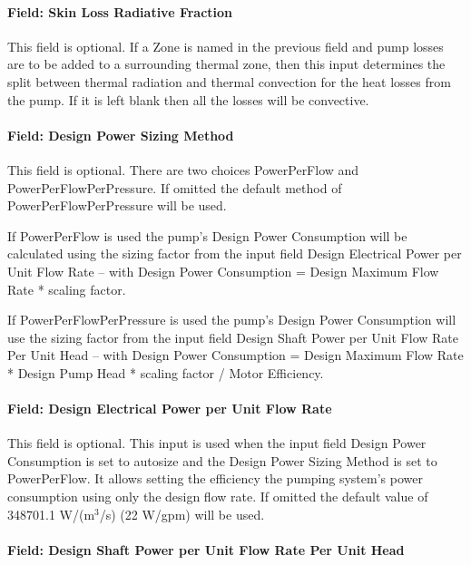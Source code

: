 \paragraph{Field: Skin Loss Radiative Fraction}\label{field-skin-loss-radiative-fraction-1-000}

This field is optional. If a Zone is named in the previous field and pump losses are to be added to a surrounding thermal zone, then this input determines the split between thermal radiation and thermal convection for the heat losses from the pump. If it is left blank then all the losses will be convective.

\paragraph{Field: Design Power Sizing Method}\label{field-design-power-sizing-method-1}

This field is optional. There are two choices PowerPerFlow and PowerPerFlowPerPressure. If omitted the default method of PowerPerFlowPerPressure will be used.

If PowerPerFlow is used the pump's Design Power Consumption will be calculated using the sizing factor from the input field Design Electrical Power per Unit Flow Rate -- with Design Power Consumption = Design Maximum Flow Rate * scaling factor.

If PowerPerFlowPerPressure is used the pump's Design Power Consumption will use the sizing factor from the input field Design Shaft Power per Unit Flow Rate Per Unit Head -- with Design Power Consumption = Design Maximum Flow Rate * Design Pump Head * scaling factor / Motor Efficiency.

\paragraph{Field: Design Electrical Power per Unit Flow Rate}\label{field-design-electrical-power-per-unit-flow-rate}

This field is optional. This input is used when the input field Design Power Consumption is set to autosize and the Design Power Sizing Method is set to PowerPerFlow. It allows setting the efficiency the pumping system's power consumption using only the design flow rate. If omitted the default value of 348701.1 W/(m\(^{3}\)/s) (22 W/gpm) will be used.

\paragraph{Field: Design Shaft Power per Unit Flow Rate Per Unit Head}\label{field-design-shaft-power-per-unit-flow-rate-per-unit-head-1}

